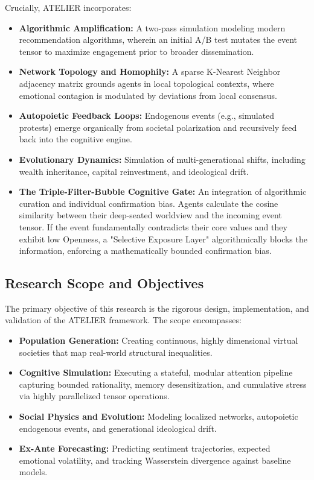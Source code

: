 \documentclass[12pt]{IEEEtran}
\begin{document}
Crucially, ATELIER incorporates:
\begin{itemize}
    \item \textbf{Algorithmic Amplification:} A two-pass simulation modeling modern recommendation algorithms, wherein an initial A/B test mutates the event tensor to maximize engagement prior to broader dissemination.
    \item \textbf{Network Topology and Homophily:} A sparse K-Nearest Neighbor adjacency matrix grounds agents in local topological contexts, where emotional contagion is modulated by deviations from local consensus.
    \item \textbf{Autopoietic Feedback Loops:} Endogenous events (e.g., simulated protests) emerge organically from societal polarization and recursively feed back into the cognitive engine.
    \item \textbf{Evolutionary Dynamics:} Simulation of multi-generational shifts, including wealth inheritance, capital reinvestment, and ideological drift.
    \item \textbf{The Triple-Filter-Bubble Cognitive Gate:} An integration of algorithmic curation and individual confirmation bias. Agents calculate the cosine similarity between their deep-seated worldview and the incoming event tensor. If the event fundamentally contradicts their core values and they exhibit low Openness, a "Selective Exposure Layer" algorithmically blocks the information, enforcing a mathematically bounded confirmation bias.
\end{itemize}

\subsection{Research Scope and Objectives}
The primary objective of this research is the rigorous design, implementation, and validation of the ATELIER framework. The scope encompasses:
\begin{itemize}
    \item \textbf{Population Generation:} Creating continuous, highly dimensional virtual societies that map real-world structural inequalities.
    \item \textbf{Cognitive Simulation:} Executing a stateful, modular attention pipeline capturing bounded rationality, memory desensitization, and cumulative stress via highly parallelized tensor operations.
    \item \textbf{Social Physics and Evolution:} Modeling localized networks, autopoietic endogenous events, and generational ideological drift.
    \item \textbf{Ex-Ante Forecasting:} Predicting sentiment trajectories, expected emotional volatility, and tracking Wasserstein divergence against baseline models.
\end{itemize}
\end{document}
